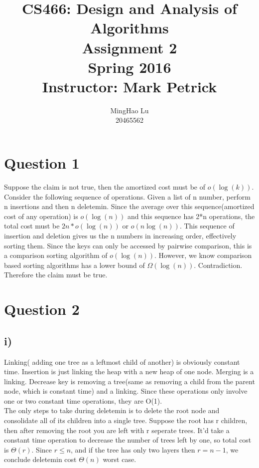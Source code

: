 \documentclass{article}
\title{CS466: Design and Analysis of Algorithms \\ Assignment 2 \\ Spring 2016 \\ Instructor: Mark Petrick}
\author{MingHao Lu \\ 20465562}
\begin{document}
    \maketitle
    \newpage

\section*{Question 1}
    Suppose the claim is not true, then the amortized cost must be of  $o(\log(k))$. 
    Consider the following sequence of operations. Given a list of n number, perform n insertions
    and then n deletemin. Since the average over this sequence(amortized cost of any operation) is $o(\log(n))$ 
    and this sequence has 2*n operations, the total cost must be $2n*o(\log(n))$ or $o(n\log(n))$.
    This sequence of insertion and deletion gives us the n numbers in increasing order, effectively sorting them.
    Since the keys can only be accessed by pairwise comparison, this is a comparison
    sorting algorithm of $o(\log(n))$. However, we know comparison based sorting algorithms
    has a lower bound of $\Omega(\log(n))$. Contradiction. Therefore the claim must be true.

\section*{Question 2}
\subsection*{i)}
    Linking( adding one tree as a leftmost child of another) is obviously constant time. Insertion
    is just linking the heap with a new heap of one node. Merging is a linking. Decrease key is removing
    a tree(same as removing a child from the parent node, which is constant time) and a linking.
    Since these operations only involve one or two constant time operations, they are O(1). \\

    The only steps to take during deletemin is to delete the root node and consolidate all
    of its children into a single tree. Suppose the root has r children, then after removing
    the root you are left with r seperate trees. It'd take a constant time operation to
    decrease the number of trees left by one, so total cost is $\Theta(r)$.
    Since $ r \le n$, and if the tree has only two layers then $r=n-1$, we conclude deletemin
    cost $\Theta(n)$ worst case.
\end{document}
